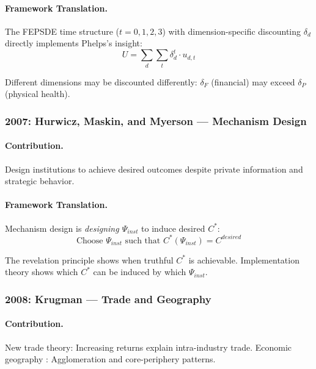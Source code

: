 \paragraph{Framework Translation.}
The FEPSDE time structure ($t = 0, 1, 2, 3$) with dimension-specific discounting
$\delta_d$ directly implements Phelps's insight:
\begin{equation}
  U = \sum_d \sum_t \delta_d^t \cdot u_{d,t}
\end{equation}

Different dimensions may be discounted differently:
$\delta_F$ (financial) may exceed $\delta_P$ (physical health).

\subsubsection{2007: Hurwicz, Maskin, and Myerson --- Mechanism Design}

\paragraph{Contribution.}
Design institutions to achieve desired outcomes despite private information
and strategic behavior.

\paragraph{Framework Translation.}
Mechanism design is \emph{designing $\Psi_{inst}$} to induce desired $C^*$:
\begin{equation}
  \text{Choose } \Psi_{inst} \text{ such that } C^*(\Psi_{inst}) = C^{desired}
\end{equation}

The revelation principle shows when truthful $C^*$ is achievable.
Implementation theory shows which $C^*$ can be induced by which $\Psi_{inst}$.

\subsubsection{2008: Krugman --- Trade and Geography}

\paragraph{Contribution.}
New trade theory: Increasing returns explain intra-industry trade.
Economic geography \citep{krugman1991}: Agglomeration and core-periphery patterns.

